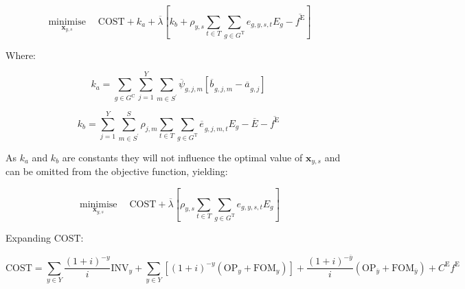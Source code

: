 \documentclass{article}
\newcommand{\sGeneratorsCandidate}{G^{\mathrm{C}}}
\newcommand{\sGeneratorsThermal}{G^{\mathrm{T}}}
\newcommand{\sYears}{Y}
\newcommand{\sScenarios}{S}
\newcommand{\sIntervals}{T}
\newcommand{\iGenerator}{g}
\newcommand{\iYear}{y}
\newcommand{\iYearTerminal}{\overline{\iYear}}
\newcommand{\iYearAlias}{j}
\newcommand{\iScenario}{s}
\newcommand{\iScenarioAlias}{m}
\newcommand{\iInterval}{t}
\newcommand{\cOperatingCost}[1][\iYear,\iScenario]{\mathrm{OP}_{#1}}
\newcommand{\cFixedOperationsMaintenanceCost}[1][\iGenerator]{\mathrm{FOM}_{#1}}
\newcommand{\cScenarioDuration}[1][\iYear,\iScenario]{\rho_{#1}}
\newcommand{\cEmissionsIntensity}[1][\iGenerator]{E_{#1}}
\newcommand{\cInvestmentCost}[1][\iYear]{\mathrm{INV}_{#1}}
\newcommand{\cInterestRate}{i}
\newcommand{\cEmmissionsCumulativeTarget}{\overline{E}}
\newcommand{\cEmissionsTargetViolationPenalty}{C^{\mathrm{E}}}
\newcommand{\cObjectiveFunction}{\mathrm{COST}}
\newcommand{\vEnergy}[1][\iGenerator,\iYear,\iScenario,\iInterval]{e_{#1}}
\newcommand{\vEmissionsTargetViolation}{f^{\mathrm{E}}}
\newcommand{\vInstalledCapacityTotal}[1][\iGenerator,\iYear]{a_{#1}}
\newcommand{\vInstalledCapacityTotalScenario}[1][\iGenerator,\iYear,\iScenario]{b_{#1}}
\DeclareMathOperator*{\minimise}{minimise}
\begin{document}
\begin{equation}
	\minimise\limits_{\bm{x}_{\iYear,\iScenario}} \quad\cObjectiveFunction + k_{a} + \overline{\lambda} \left[k_{b} + \cScenarioDuration\sum\limits_{\iInterval \in \sIntervals}\sum\limits_{\iGenerator \in \sGeneratorsThermal} \vEnergy[\iGenerator,\iYear,\iScenario,\iInterval] \cEmissionsIntensity - \overline{\vEmissionsTargetViolation}\right]
\end{equation}

Where:

\begin{equation}
	k_{a} = \sum\limits_{\iGenerator \in \sGeneratorsCandidate}\sum\limits_{\iYearAlias=1}^{\sYears}\sum\limits_{\iScenarioAlias \in\sScenarios^{\prime}}\overline{\psi}_{\iGenerator,\iYearAlias,\iScenarioAlias}\left[\overline{\vInstalledCapacityTotalScenario[]}_{\iGenerator,\iYearAlias,\iScenarioAlias} - \overline{\vInstalledCapacityTotal[]}_{\iGenerator,\iYearAlias}\right]
\end{equation}

\begin{equation}
	k_{b} = \sum\limits_{\iYearAlias=1}^{\sYears} \sum\limits_{\iScenarioAlias \in \sScenarios^{\prime}}^{\sScenarios} \cScenarioDuration[\iYearAlias,\iScenarioAlias] \sum\limits_{\iInterval \in \sIntervals} \sum\limits_{\iGenerator \in \sGeneratorsThermal} \overline{\vEnergy[]}_{\iGenerator,\iYearAlias,\iScenarioAlias,\iInterval} \cEmissionsIntensity - \cEmmissionsCumulativeTarget - \overline{\vEmissionsTargetViolation}
\end{equation}

As $k_{a}$ and $k_{b}$ are constants they will not influence the optimal value of $\bm{x}_{\iYear,\iScenario}$ and can be omitted from the objective function, yielding:

\begin{equation}
	\minimise\limits_{\bm{x}_{\iYear,\iScenario}} \quad \cObjectiveFunction + \overline{\lambda} \left[\cScenarioDuration\sum\limits_{\iInterval \in \sIntervals}\sum\limits_{\iGenerator \in \sGeneratorsThermal} \vEnergy[\iGenerator,\iYear,\iScenario,\iInterval] \cEmissionsIntensity \right]
\end{equation}

Expanding $\cObjectiveFunction$:

\begin{equation}
	\cObjectiveFunction = \sum\limits_{\iYear \in \sYears} \frac{(1+\cInterestRate)^{-\iYear}}{\cInterestRate}\cInvestmentCost + \sum\limits_{\iYear \in \sYears} \left[(1+\cInterestRate)^{-\iYear} (\cOperatingCost[\iYear] + \cFixedOperationsMaintenanceCost[\iYear]) \right] + \frac{(1+\cInterestRate)^{-\iYearTerminal}}{\cInterestRate} \left(\cOperatingCost[\iYearTerminal] + \cFixedOperationsMaintenanceCost[\iYearTerminal] \right) + \cEmissionsTargetViolationPenalty \vEmissionsTargetViolation
\end{equation}
\end{document}
